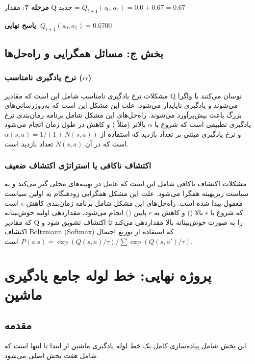 \documentclass{article}
\begin{document}
\textbf{مرحله 7}: مقدار Q جدید = $Q_{t+1}(s_0, a_1) = 0.0 + 0.67 = 0.67$

\textbf{پاسخ نهایی}: $Q_{t+1}(s_0, a_1) = 0.6700$

\subsection{بخش ج: مسائل همگرایی و راه‌حل‌ها}

\subsubsection{نرخ یادگیری نامناسب ($\alpha$)}

مشکلات نرخ یادگیری نامناسب شامل این است که مقادیر Q نوسان می‌کنند یا واگرا می‌شوند و یادگیری ناپایدار می‌شود. علت این مشکل این است که به‌روزرسانی‌های بزرگ باعث بیش‌برآورد می‌شوند. راه‌حل‌های این مشکل شامل برنامه زمان‌بندی نرخ یادگیری تطبیقی است که شروع با $\alpha$ بالاتر (مثلاً ) و کاهش در طول زمان انجام می‌شود و نرخ یادگیری مبتنی بر تعداد بازدید که استفاده از $\alpha(s,a) = 1 / (1 + N(s,a))$ است که در آن $N(s,a)$ تعداد بازدید است.

\subsubsection{اکتشاف ناکافی یا استراتژی اکتشاف ضعیف}

مشکلات اکتشاف ناکافی شامل این است که عامل در بهینه‌های محلی گیر می‌کند و به سیاست زیربهینه همگرا می‌شود. علت این مشکل همگرایی زودهنگام به اولین سیاست معقول پیدا شده است. راه‌حل‌های این مشکل شامل برنامه زمان‌بندی کاهش $\epsilon$ است که شروع با $\epsilon$ بالا () و کاهش به $\epsilon$ پایین () انجام می‌شود، مقداردهی اولیه خوش‌بینانه که مقادیر Q را به صورت خوش‌بینانه بالا مقداردهی می‌کند تا اکتشاف تشویق شود و اکتشاف Boltzmann (Softmax) که استفاده از توزیع احتمال $P(a|s) = \exp(Q(s,a)/\tau) / \sum \exp(Q(s,a')/\tau)$ است.

\section{پروژه نهایی: خط لوله جامع یادگیری ماشین}\label{Section:FinalProject}

\subsection{مقدمه}

این بخش شامل پیاده‌سازی کامل یک خط لوله یادگیری ماشین از ابتدا تا انتها است که شامل هفت بخش اصلی می‌شود.
\end{document}
